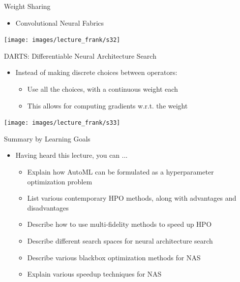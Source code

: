 {
\begin{frame}[c]{Weight Sharing}
\begin{itemize}
	\item Convolutional Neural Fabrics 
\end{itemize}
{\centering
	\texttt{[image: images/lecture\_frank/s32]}
}
\end{frame}
}
{
\begin{frame}[c]{DARTS: Differentiable Neural Architecture Search}
\begin{itemize}
	\item Instead of making discrete choices between operators:
	\begin{itemize}
		\item Use all the choices, with a continuous weight each
		\item This allows for computing gradients w.r.t. the weight
	\end{itemize}
\end{itemize}
{\centering
	\texttt{[image: images/lecture\_frank/s33]}
}
\end{frame}
}
\begin{frame}[c]{Summary by Learning Goals}
\begin{itemize}
	\item Having heard this lecture, you can ...
	\begin{itemize}
		\item Explain how AutoML can be formulated as a hyperparameter
		optimization problem
		\item List various contemporary HPO methods, along with advantages
		and disadvantages
		\item Describe how to use multi-fidelity methods to speed up HPO
		\item Describe different search spaces for neural architecture search
		\item Describe various blackbox optimization methods for NAS
		\item Explain various speedup techniques for NAS
	\end{itemize}
\end{itemize}
\end{frame}
